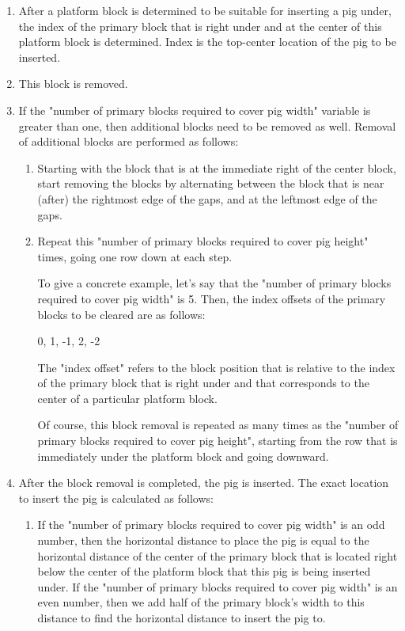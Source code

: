 \documentclass{dalthesis}
\begin{document}
\begin{enumerate}
  \begin{enumerate}
    \item After a platform block is determined to be suitable for inserting a pig under, the index of the primary block that is right under and at the center of this platform block is determined. Index is the top-center location of the pig to be inserted.

    \item This block is removed.

    \item If the "number of primary blocks required to cover pig width" variable is greater than one, then additional blocks need to be removed as well. Removal of additional blocks are performed as follows:

    \begin{enumerate}
      \item Starting with the block that is at the immediate right of the center block, start removing the blocks by alternating between the block that is near (after) the rightmost edge of the gaps, and at the leftmost edge of the gaps.

      \item Repeat this "number of primary blocks required to cover pig height" times, going one row down at each step.

      To give a concrete example, let's say that the "number of primary blocks required to cover pig width" is 5. Then, the index offsets of the primary blocks to be cleared are as follows:

      0, 1, -1, 2, -2

      The "index offset" refers to the block position that is relative to the index of the primary block that is right under and that corresponds to the center of a particular platform block.

      Of course, this block removal is repeated as many times as the "number of primary blocks required to cover pig height", starting from the row that is immediately under the platform block and going downward.
    \end{enumerate}

    \item After the block removal is completed, the pig is inserted. The exact location to insert the pig is calculated as follows:

    \begin{enumerate}
      \item If the "number of primary blocks required to cover pig width" is an odd number, then the horizontal distance to place the pig is equal to the horizontal distance of the center of the primary block that is located right below the center of the platform block that this pig is being inserted under. If the "number of primary blocks required to cover pig width" is an even number, then we add half of the primary block's width to this distance to find the horizontal distance to insert the pig to.


\end{enumerate}
\end{enumerate}
\end{enumerate}
\end{document}
